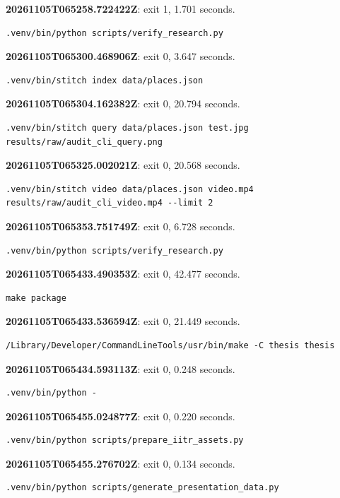 \noindent\textbf{20261105T065258.722422Z}: exit 1, 1.701 seconds.
\begin{lstlisting}[numbers=none]
.venv/bin/python scripts/verify_research.py
\end{lstlisting}

\noindent\textbf{20261105T065300.468906Z}: exit 0, 3.647 seconds.
\begin{lstlisting}[numbers=none]
.venv/bin/stitch index data/places.json
\end{lstlisting}

\noindent\textbf{20261105T065304.162382Z}: exit 0, 20.794 seconds.
\begin{lstlisting}[numbers=none]
.venv/bin/stitch query data/places.json test.jpg results/raw/audit_cli_query.png
\end{lstlisting}

\noindent\textbf{20261105T065325.002021Z}: exit 0, 20.568 seconds.
\begin{lstlisting}[numbers=none]
.venv/bin/stitch video data/places.json video.mp4 results/raw/audit_cli_video.mp4 --limit 2
\end{lstlisting}

\noindent\textbf{20261105T065353.751749Z}: exit 0, 6.728 seconds.
\begin{lstlisting}[numbers=none]
.venv/bin/python scripts/verify_research.py
\end{lstlisting}

\noindent\textbf{20261105T065433.490353Z}: exit 0, 42.477 seconds.
\begin{lstlisting}[numbers=none]
make package
\end{lstlisting}

\noindent\textbf{20261105T065433.536594Z}: exit 0, 21.449 seconds.
\begin{lstlisting}[numbers=none]
/Library/Developer/CommandLineTools/usr/bin/make -C thesis thesis
\end{lstlisting}

\noindent\textbf{20261105T065434.593113Z}: exit 0, 0.248 seconds.
\begin{lstlisting}[numbers=none]
.venv/bin/python -
\end{lstlisting}

\noindent\textbf{20261105T065455.024877Z}: exit 0, 0.220 seconds.
\begin{lstlisting}[numbers=none]
.venv/bin/python scripts/prepare_iitr_assets.py
\end{lstlisting}

\noindent\textbf{20261105T065455.276702Z}: exit 0, 0.134 seconds.
\begin{lstlisting}[numbers=none]
.venv/bin/python scripts/generate_presentation_data.py
\end{lstlisting}

